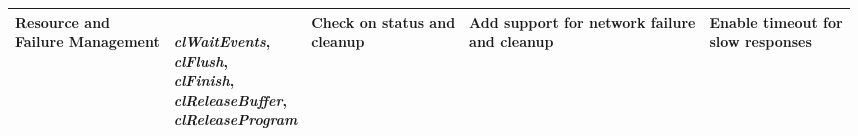 \begin{landscape}
\begin{table}
\begin{tabular}{p{3.0cm}|p{5.5cm}|p{3.5cm}|p{5.0cm}|p{3.7cm}}
    \parbox{3.0cm}{\centering Resource and \\Failure Management} &
\parbox{5.5cm}{\centering \textit{}
\\\textit{clWaitEvents},\\\textit{clFlush},\\\textit{clFinish},\\\textit{clReleaseBuffer},\\\textit{clReleaseProgram}
\\\textit{}}
& \parbox{3.5cm}{\centering Check on status and\\ cleanup} &
\parbox{5.0cm}{\centering Add support for network failure\\ and cleanup} &
\parbox{3.7cm}{\centering Enable timeout for\\ slow responses} \\ \hline
    \end{tabular}
\label{table:functionality}
\end{table}
\end{landscape}
%
